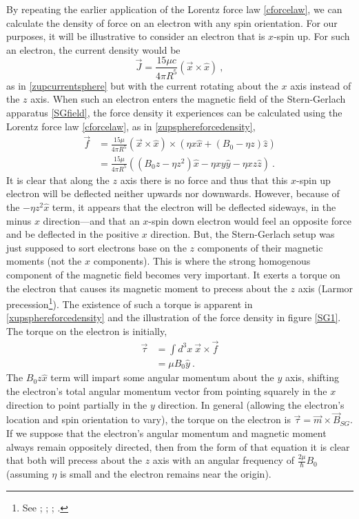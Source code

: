 \documentclass[12pt,secnumarabic,amsmath,amssymb,balancelastpage,nofootinbib]{article}
\begin{document}
By repeating the earlier application of the Lorentz force law \eqref{cforcelaw}, we can calculate the density of force on an electron with any spin orientation.  For our purposes, it will be illustrative to consider an electron that is $x$-spin up.  For such an electron, the current density would be
\begin{equation}
\vec{J}=\frac{15 \mu c}{4 \pi R^5} ( \vec{x}\times \hat{x} )
\ ,
\label{xupcurrentsphere}
\end{equation}
as in \eqref{zupcurrentsphere} but with the current rotating about the $x$ axis instead of the $z$ axis.  When such an electron enters the magnetic field of the Stern-Gerlach apparatus \eqref{SGfield}, the force density it experiences can be calculated using the Lorentz force law \eqref{cforcelaw}, as in \eqref{zupsphereforcedensity},
\begin{align}
\vec{f}&=\frac{15 \mu}{4 \pi R^5} (\vec{x}\times\hat{x})\times(\eta x \hat{x} +(B_0 - \eta z)\hat{z})
\nonumber
\\
&=\frac{15 \mu}{4 \pi R^5} \left( (B_0 z - \eta z^2) \hat{x} - \eta x y \hat{y} - \eta x z \hat{z} \right)
\ .
\label{xupsphereforcedensity}
\end{align}
It is clear that along the $z$ axis there is no force and thus that this $x$-spin up electron will be deflected neither upwards nor downwards.  However, because of the  $- \eta z^2 \hat{x}$ term, it appears that the electron will be deflected sideways, in the minus $x$ direction---and that an $x$-spin down electron would feel an opposite force and be deflected in the positive $x$ direction.  But, the Stern-Gerlach setup was just supposed to sort electrons base on the $z$ components of their magnetic moments (not the $x$ components).  This is where the strong homogenous component of the magnetic field becomes very important.  It exerts a torque on the electron that causes its magnetic moment to precess about the $z$ axis (Larmor precession\footnote{See \citet[sec.\ 34.3]{feynman2}; \citet[sec.\ 45]{landaulifshitzfields}; \citet{alstrom1982}; \citet[sec.\ 4.4.2]{griffithsQM}.}).  The existence of such a torque is apparent in \eqref{xupsphereforcedensity} and the illustration of the force density in figure \ref{SG1}.  The torque on the electron is initially,
\begin{align}
\vec{\tau}&=\int d^3 x \ \vec{x} \times \vec{f}
\nonumber
\\
&=\mu B_0 \hat{y}
\ .
\label{xupspheretorque}
\end{align}
The $B_0 z \hat{x}$ term will impart some angular momentum about the $y$ axis, shifting the electron's total angular momentum vector from pointing squarely in the $x$ direction to point partially in the $y$ direction.  In general (allowing the electron's location and spin orientation to vary), the torque on the electron is $\vec{\tau}= \vec{m}\times\vec{B}_{SG}$.  If we suppose that the electron's angular momentum and magnetic moment always remain oppositely directed, then from the form of that equation it is clear that both will precess about the $z$ axis with an angular frequency of $\frac{2\mu}{\hbar} B_0$ (assuming $\eta$ is small and the electron remains near the origin).
\end{document}

